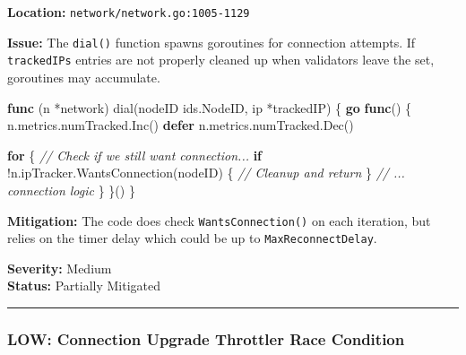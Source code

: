 \documentclass[
]{article}
\newenvironment{Shaded}{}{}
\newcommand{\CommentTok}[1]{\textcolor[rgb]{0.38,0.63,0.69}{\textit{#1}}}
\newcommand{\ControlFlowTok}[1]{\textcolor[rgb]{0.00,0.44,0.13}{\textbf{#1}}}
\newcommand{\KeywordTok}[1]{\textcolor[rgb]{0.00,0.44,0.13}{\textbf{#1}}}
\newcommand{\NormalTok}[1]{#1}
\newcommand{\OperatorTok}[1]{\textcolor[rgb]{0.40,0.40,0.40}{#1}}
\begin{document}
\textbf{Location:} \texttt{network/network.go:1005-1129}

\textbf{Issue:} The \texttt{dial()} function spawns goroutines for
connection attempts. If \texttt{trackedIPs} entries are not properly
cleaned up when validators leave the set, goroutines may accumulate.

\begin{Shaded}
\begin{Highlighting}[]
\KeywordTok{func} \OperatorTok{(}\NormalTok{n }\OperatorTok{*}\NormalTok{network}\OperatorTok{)}\NormalTok{ dial}\OperatorTok{(}\NormalTok{nodeID ids}\OperatorTok{.}\NormalTok{NodeID}\OperatorTok{,}\NormalTok{ ip }\OperatorTok{*}\NormalTok{trackedIP}\OperatorTok{)} \OperatorTok{\{}
    \ControlFlowTok{go} \KeywordTok{func}\OperatorTok{()} \OperatorTok{\{}
\NormalTok{        n}\OperatorTok{.}\NormalTok{metrics}\OperatorTok{.}\NormalTok{numTracked}\OperatorTok{.}\NormalTok{Inc}\OperatorTok{()}
        \ControlFlowTok{defer}\NormalTok{ n}\OperatorTok{.}\NormalTok{metrics}\OperatorTok{.}\NormalTok{numTracked}\OperatorTok{.}\NormalTok{Dec}\OperatorTok{()}

        \ControlFlowTok{for} \OperatorTok{\{}
            \CommentTok{// Check if we still want connection...}
            \ControlFlowTok{if} \OperatorTok{!}\NormalTok{n}\OperatorTok{.}\NormalTok{ipTracker}\OperatorTok{.}\NormalTok{WantsConnection}\OperatorTok{(}\NormalTok{nodeID}\OperatorTok{)} \OperatorTok{\{}
                \CommentTok{// Cleanup and return}
            \OperatorTok{\}}
            \CommentTok{// ... connection logic}
        \OperatorTok{\}}
    \OperatorTok{\}()}
\OperatorTok{\}}
\end{Highlighting}
\end{Shaded}

\textbf{Mitigation:} The code does check \texttt{WantsConnection()} on
each iteration, but relies on the timer delay which could be up to
\texttt{MaxReconnectDelay}.

\textbf{Severity:} Medium\\
\textbf{Status:} Partially Mitigated

\begin{center}\rule{0.5\linewidth}{0.5pt}\end{center}

\subsubsection{LOW: Connection Upgrade Throttler Race
Condition}\label{low-connection-upgrade-throttler-race-condition}
\end{document}
